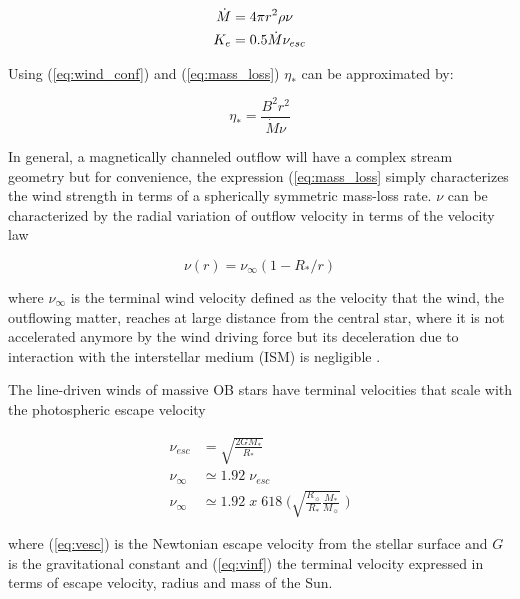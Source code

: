 \documentclass[fleqn,usenatbib]{mnras}
\begin{document}
\begin{ceqn}
\begin{align}
    \Dot{M} &= 4\pi r^2\rho\nu \label{eq:mass_loss}\\
    K_e &= 0.5\Dot{M}\nu_{esc}
\end{align}
\end{ceqn}

Using (\ref{eq:wind_conf}) and (\ref{eq:mass_loss}) $\eta_*$ can be approximated by: 
\begin{ceqn}
\begin{equation}
    \eta_* = \frac{B^{2}r^{2}}{\Dot{M}\nu} \label{eq:wind_conf2}
\end{equation}
\end{ceqn}

 
In general, a magnetically channeled outflow will have a complex stream geometry but for convenience, the expression (\ref{eq:mass_loss} simply characterizes the wind strength in terms of a spherically symmetric mass-loss rate. $\nu$ can be characterized by the radial variation of outflow velocity in terms of the velocity law 
\begin{ceqn}
\begin{equation}
    \nu(r) = \nu_\infty (1-R_*/r)
\end{equation}
\end{ceqn}
where $\nu_\infty$ is the terminal wind velocity defined as the velocity that the wind, the outflowing matter, reaches at large distance from the central star, where it is not accelerated anymore by the wind driving force but its deceleration due to interaction with the interstellar medium (ISM) is negligible \citep{Niedzielski2002}.\par

The line-driven winds of massive OB stars have terminal velocities that scale with the photospheric escape velocity \citep{Lamers2000}
\begin{ceqn}
\begin{align}
\nu_{esc} &= \sqrt{\frac{2GM_*}{R_*}} \label{eq:vesc} \\
\nu_\infty &\simeq 1.92 \;\nu_{esc}\\
\nu_\infty &\simeq 1.92 \; x \; 618 \; \Bigg(\sqrt{\frac{R_{\sun}}{R_*}\frac{M_*}{M_{\sun}}} \;\Bigg) \label{eq:vinf}
\end{align}
\end{ceqn}
where (\ref{eq:vesc}) is the Newtonian escape velocity from the stellar surface and $G$ is the gravitational constant and (\ref{eq:vinf}) the terminal velocity expressed in terms of escape velocity, radius and mass of the Sun.\par
\end{document}
